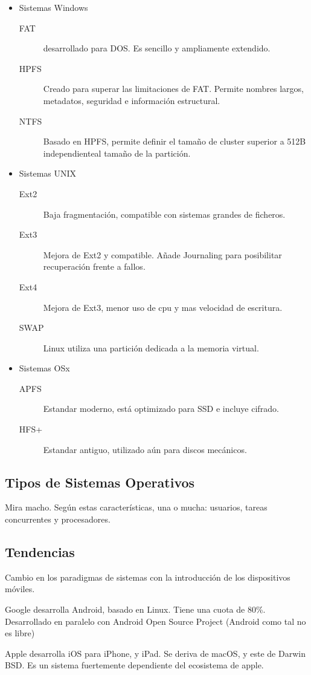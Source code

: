 \begin{itemize}
    \item Sistemas Windows
    \begin{description}
        \item[FAT] desarrollado para DOS. Es sencillo y ampliamente extendido.
        \item[HPFS] Creado para superar las limitaciones de FAT. Permite nombres largos, metadatos, seguridad e información estructural.
        \item[NTFS] Basado en HPFS, permite definir el tamaño de cluster superior a 512B independienteal tamaño de la partición.
    \end{description}
    \item Sistemas UNIX
    \begin{description}
        \item[Ext2] Baja fragmentación, compatible con sistemas grandes de ficheros.
        \item[Ext3] Mejora de Ext2 y compatible. Añade Journaling para posibilitar recuperación frente a fallos.
        \item[Ext4] Mejora de Ext3, menor uso de cpu y mas velocidad de escritura.
        \item[SWAP] Linux utiliza una partición dedicada a la memoria virtual.
    \end{description}
    \item Sistemas OSx
    \begin{description}
        \item[APFS] Estandar moderno, está optimizado para SSD e incluye cifrado.
        \item[HFS+] Estandar antiguo, utilizado aún para discos mecánicos.
    \end{description}

\end{itemize}

\subsection{Tipos de Sistemas Operativos}
Mira macho. Según estas características, una o mucha: usuarios, tareas concurrentes y procesadores.

\subsection{Tendencias}
Cambio en los paradigmas de sistemas con la introducción de los dispositivos móviles.

Google desarrolla Android, basado en Linux. Tiene una cuota de 80\%. Desarrollado en paralelo con Android Open Source Project (Android como tal no es libre)

Apple desarrolla iOS para iPhone, y iPad. Se deriva de macOS, y este de Darwin BSD. Es un sistema fuertemente dependiente del ecosistema de apple.
